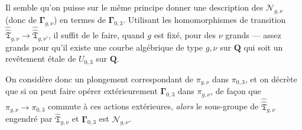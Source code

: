 Il semble qu'on puisse sur le même principe donner une description des $\mathcal{N}_{g,\nu}$ (donc de $\boldsymbol{\Gamma}_{g,\nu}$) en termes de $\boldsymbol{\Gamma}_{0,3}$. Utilisant les homomorphismes de transition $\hat{\hat{\mathfrak{T}}}_{g,\nu} \to\hat{\hat{\mathfrak{T}}}_{g,\nu'}$, il suffit de le faire, quand $g$ est fixé, pour des $\nu$ grands --- assez grands pour qu'il existe une courbe algébrique de type $g,\nu$ sur $\mathbf{Q}$ qui soit un revêtement étale de $U_{0,3}$ sur $\mathbf{Q}$. 

On considère donc un plongement correspondant de $\pi_{g,\nu}$ dans $\pi_{0,3}$, et on décrète que si on peut faire opérer extérieurement $\boldsymbol{\Gamma}_{0,3}$ dans $\pi_{g,\nu}$, de fa\c{c}on que $\pi_{g,\nu} \to \pi_{0,3}$ commute à ces actions extérieures, \emph{alors} le sous-groupe de $\hat{\hat{\mathfrak{T}}}_{g,\nu}$ engendré par $\hat{\mathfrak{T}}_{g,\nu}$ et $\boldsymbol{\Gamma}_{0,3}$ est $\mathcal{N}_{g,\nu}$.


